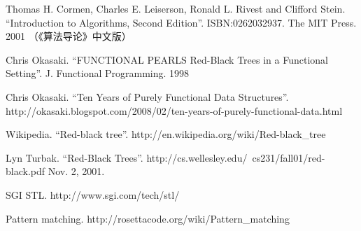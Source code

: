 \documentclass{ctexart}
\begin{document}
\ifx\wholebook\relax \else
\begin{thebibliography}{99}

Thomas H. Cormen, Charles E. Leiserson, Ronald L. Rivest and Clifford Stein.
``Introduction to Algorithms, Second Edition''. ISBN:0262032937. The MIT Press. 2001 （《算法导论》中文版）

Chris Okasaki. ``FUNCTIONAL PEARLS Red-Black Trees in a Functional Setting''. J. Functional Programming. 1998

Chris Okasaki. ``Ten Years of Purely Functional Data Structures''. http://okasaki.blogspot.com/2008/02/ten-years-of-purely-functional-data.html

Wikipedia. ``Red-black tree''. http://en.wikipedia.org/wiki/Red-black\_tree

Lyn Turbak. ``Red-Black Trees''. http://cs.wellesley.edu/~cs231/fall01/red-black.pdf Nov. 2, 2001.

SGI STL. http://www.sgi.com/tech/stl/

Pattern matching. http://rosettacode.org/wiki/Pattern\_matching

\end{thebibliography}
\end{document}
